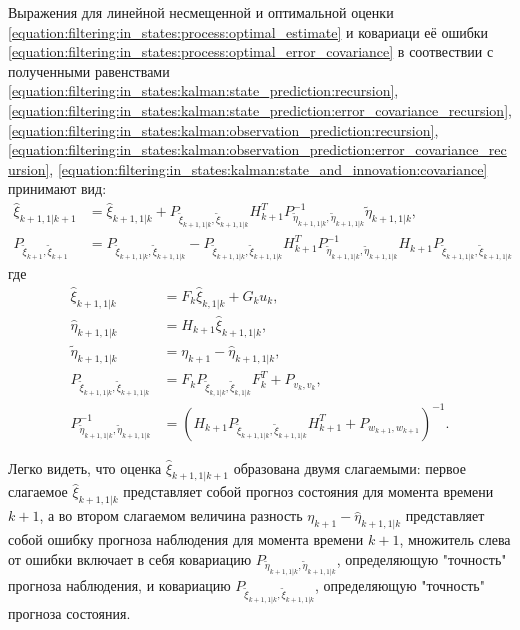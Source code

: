 Выражения для линейной несмещенной и оптимальной оценки \eqref{equation:filtering:in_states:process:optimal_estimate} и ковариаци её ошибки
\eqref{equation:filtering:in_states:process:optimal_error_covariance} в соотвествии с полученными равенствами
\eqref{equation:filtering:in_states:kalman:state_prediction:recursion},
\eqref{equation:filtering:in_states:kalman:state_prediction:error_covariance_recursion},
\eqref{equation:filtering:in_states:kalman:observation_prediction:recursion},
\eqref{equation:filtering:in_states:kalman:observation_prediction:error_covariance_recursion},
\eqref{equation:filtering:in_states:kalman:state_and_innovation:covariance}
принимают вид:
\begin{align*}
	\widehat{\xi}_{k+1, 1|k+1}
		& = \widehat{\xi}_{k+1, 1|k}
			+ P_{\widetilde{\xi}_{k+1, 1|k}, \widetilde{\xi}_{k+1, 1|k}} H_{k+1}^T P_{\widetilde{\eta}_{k+1, 1|k}, \widetilde{\eta}_{k+1, 1|k}}^{-1} \widetilde{\eta}_{k+1,1|k} , \\
	P_{\widetilde{\xi}_{k+1}, \widetilde{\xi}_{k+1}}
		&= P_{\widetilde{\xi}_{k+1,1|k}, \widetilde{\xi}_{k+1,1|k}}
			- P_{\widetilde{\xi}_{k+1,1|k}, \widetilde{\xi}_{k+1,1|k}} H_{k+1}^T P_{\widetilde{\eta}_{k+1, 1|k}, \widetilde{\eta}_{k+1, 1|k}}^{-1} H_{k+1} P_{\widetilde{\xi}_{k+1,1|k}, \widetilde{\xi}_{k+1,1|k}}
\end{align*}
где
\begin{align*}
	\widehat{\xi}_{k+1, 1|k}
		& = F_k \widehat{\xi}_{k,1|k} + G_k u_k, \\
	\widehat{\eta}_{k+1, 1|k}
		& = H_{k+1} \widehat{\xi}_{k+1,1|k} , \\
	\widetilde{\eta}_{k+1,1|k}
		& = \eta_{k+1} - \widehat{\eta}_{k+1, 1|k} , \\
	P_{\widetilde{\xi}_{k+1,1|k}, \widetilde{\xi}_{k+1,1|k}}
		& = F_k P_{\widetilde{\xi}_{k,1|k}, \widetilde{\xi}_{k,1|k}} F_k^T + P_{v_k, v_k} , \\
	P_{\widetilde{\eta}_{k+1, 1|k}, \widetilde{\eta}_{k+1, 1|k}}^{-1}
		& = \left ( H_{k+1} P_{\widetilde{\xi}_{k+1,1|k}, \widetilde{\xi}_{k+1,1|k}} H_{k+1}^T + P_{w_{k+1}, w_{k+1}} \right )^{-1} .
\end{align*}

Легко видеть, что оценка $\widehat{\xi}_{k+1, 1|k+1}$ образована двумя слагаемыми: первое слагаемое $\widehat{\xi}_{k+1, 1|k}$ представляет собой прогноз состояния
для момента времени $k+1$, а во втором слагаемом величина разность $\eta_{k+1} - \widehat{\eta}_{k+1, 1|k}$ представляет собой ошибку прогноза наблюдения для момента
времени $k+1$, множитель слева от ошибки включает в себя ковариацию $P_{\widetilde{\eta}_{k+1, 1|k}, \widetilde{\eta}_{k+1, 1|k}}$, определяющую "точность"{}
прогноза наблюдения, и ковариацию $P_{\widetilde{\xi}_{k+1, 1|k}, \widetilde{\xi}_{k+1, 1|k}}$, определяющую "точность"{} прогноза состояния.